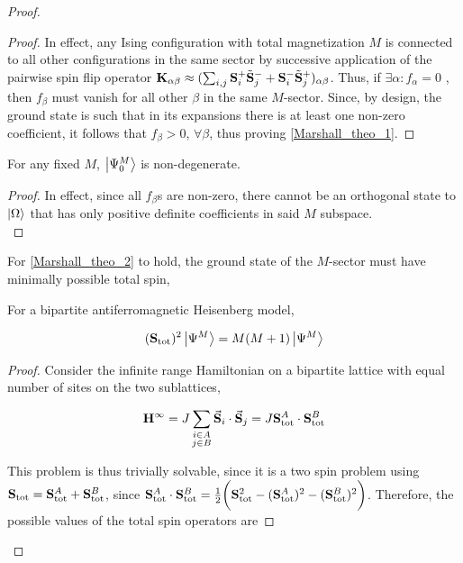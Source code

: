 \documentclass{homework}
\begin{document}
\begin{proof}
\begin{proof}
In effect, any Ising configuration with total magnetization $M$ is connected to all other configurations in the same sector by successive application of the pairwise spin flip operator ${\bf K}_{\alpha \beta} \approx (\sum_{i,j} {\bf S}_i^+ \tilde{{\bf S}}_j^- + {\bf S}_i^- \tilde{{\bf S}}_j^+)_{\alpha \beta}$. Thus, if $\exists \alpha: f_{\alpha} = 0$ , then $f_{\beta}$ must vanish for all other $\beta$ in the same $M$-sector. Since, by design, the ground state is such that in its expansions there is at least one non-zero coefficient, it follows that $f_{\beta} > 0$, $\forall{\beta}$, thus proving \cref{Marshall_theo_1}.
\end{proof}

\begin{corr}
For any fixed $M$, $\ket{\Psi^M_0}$ is non-degenerate.
\label{HH_non_degeneracy}
\end{corr}

\begin{proof}
In effect, since all $f_{\beta}$s are non-zero, there cannot be an orthogonal state to $\ket{\Omega}$ that has only positive definite coefficients in said $M$ subspace. \\
\end{proof}

For \cref{Marshall_theo_2} to hold, the ground state of the $M$-sector must have minimally possible total spin, 

\begin{lemma}
   For a bipartite antiferromagnetic Heisenberg model, 
   
   $$
   ({\bf S}_{\textnormal{tot}})^2 \ket{\Psi^M} = M(M+1)\ket{\Psi^M}
   $$
\end{lemma}

\begin{proof}
Consider the infinite range Hamiltonian on a bipartite lattice with equal number of sites on the two sublattices, 

$$
    {\bf H}^{\infty} = J \sum_{\substack{
    i \in A \\
    j \in B}} \vec{{\bf S}}_i \cdot \vec{{\bf S}}_j = J {\bf S}_{\textnormal{tot}}^A \cdot {\bf S}_{\textnormal{tot}}^B
$$

This problem is thus trivially solvable, since it is a two spin problem using ${\bf S}_{\textnormal{tot}} = {\bf S}_{\textnormal{tot}}^A + {\bf S}_{\textnormal{tot}}^B$, since ${\bf S}_{\textnormal{tot}}^A \cdot {\bf S}_{\textnormal{tot}}^B = \frac{1}{2} \bigg( {\bf S}_{\textnormal{tot}}^2 - ({\bf S}_{\textnormal{tot}}^A)^2 - ({\bf S}_{\textnormal{tot}}^B)^2 \bigg)$.
Therefore, the possible values of the total spin operators are 


\end{proof}
\end{proof}
\end{document}
